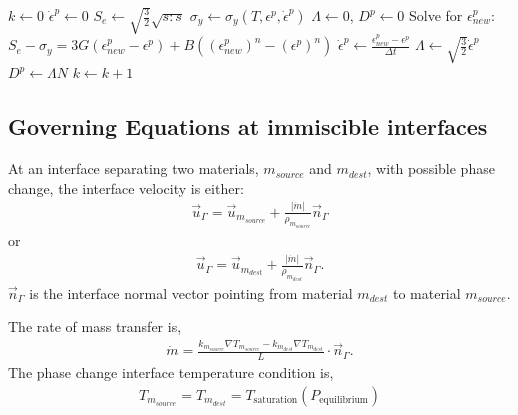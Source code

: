 \documentclass[]{article}
\begin{document}
\begin{algorithm}
\caption{Radial return algorithm for determining the
plastic strain rate tensor $D^{p}$.\label{radial_return_algorithm}}

\begin{algorithmic}[1] %
\State $k \gets 0$
\State $\dot{\epsilon}^{p}\gets 0$
\State $S_{e} \gets \sqrt{\frac{3}{2}}\sqrt{s:s}$
\State $\sigma_{y} \gets \sigma_{y}(T,\epsilon^{p},\dot{\epsilon}^{p})$
\State $\Lambda \gets 0$, $D^{p}\gets 0$
\Else
\State Solve for $\epsilon^{p}_{new}$: $
		S_{e}-\sigma_{y}=3G(\epsilon^{p}_{new}-\epsilon^{p})+
		B((\epsilon^{p}_{new})^{n}-
		  (\epsilon^{p})^{n}) $
\State $\dot{\epsilon}^{p} \gets \frac{
			 \epsilon^{p}_{new}-\epsilon^{p}}{\Delta t} $
\State $\Lambda \gets \sqrt{\frac{3}{2}}\dot{\epsilon}^{p}$
\State $D^{p} \gets \Lambda N$
\EndIf
\State $k \gets k+1$
\EndWhile
\end{algorithmic}
\end{algorithm}

\subsection{Governing Equations at immiscible interfaces }

At an interface separating two materials, $m_{source}$ and 
$m_{dest}$, with possible phase 
change\cite{palmore2019volume,villegas2016ghost,VAHAB2021,
vahab2016adaptive,ye2024improved}, 
the interface
velocity is either:
\begin{eqnarray}
\vec{u}_{\Gamma}=\vec{u}_{m_{source}}+
  \frac{|\dot{m}|}{\rho_{m_{source}}}\vec{n}_{\Gamma}
\end{eqnarray}
or
\begin{eqnarray}
\vec{u}_{\Gamma}=\vec{u}_{m_{dest}}+
  \frac{|\dot{m}|}{\rho_{m_{dest}}}\vec{n}_{\Gamma}.
\end{eqnarray}
$\vec{n}_{\Gamma}$ is the interface normal vector pointing from 
material $m_{dest}$ to material $m_{source}$.
\par\noindent
The rate of mass transfer is,
\begin{eqnarray}
	\dot{m}=\frac{
		k_{m_{source}}\nabla T_{m_{source}} -
		k_{m_{dest}}\nabla T_{m_{dest}}
              }{L}\cdot \vec{n}_{\Gamma}.
	\label{heat_flux}
\end{eqnarray}
The phase change interface temperature condition is,
\begin{eqnarray}
	T_{m_{source}}=T_{m_{dest}}=
	T_{\mbox{saturation}}(P_{\mbox{equilibrium}})
\end{eqnarray}
\end{document}
